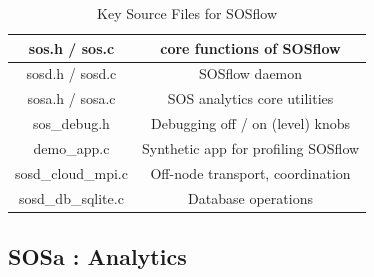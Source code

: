 \begin{table}[!t]
\renewcommand{\arraystretch}{1.3}
\caption{Key Source Files for SOSflow}
\label{tableexample}
\centering
\begin{tabular}{|c|c|}
\hline %
sos.h / sos.c & core functions of SOSflow\\
\hline %
sosd.h / sosd.c & SOSflow daemon\\
\hline %
sosa.h / sosa.c & SOS analytics core utilities\\
\hline %
sos\_debug.h & Debugging off / on (level) knobs\\
\hline %
demo\_app.c & Synthetic app for profiling SOSflow\\
\hline %
sosd\_cloud\_mpi.c & Off-node transport, coordination\\
\hline %
sosd\_db\_sqlite.c & Database operations\\
\hline %
\end{tabular}
\end{table}


\subsection{SOSa : Analytics}


